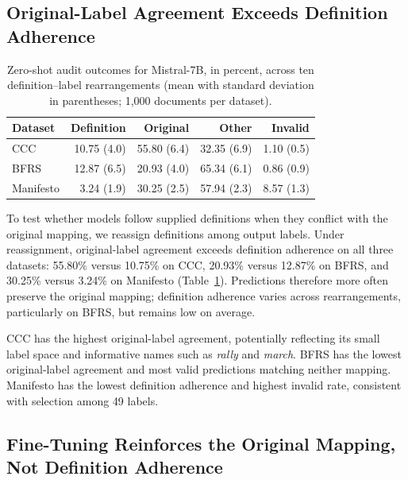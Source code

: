 \documentclass[11pt]{article}
\begin{document}
\subsection{Original-Label Agreement Exceeds Definition Adherence}
\label{sec:r-audit}

\begin{table}[t]
\centering
\small
\setlength{\tabcolsep}{3pt}

\begin{tabular}{lrrrr}
\toprule
\textbf{Dataset} & \textbf{Definition} & \textbf{Original} & \textbf{Other} & \textbf{Invalid} \\
\midrule
CCC        & 10.75 (4.0) & 55.80 (6.4) & 32.35 (6.9)& 1.10 (0.5) \\
BFRS       & 12.87 (6.5) & 20.93 (4.0) & 65.34 (6.1) & 0.86 (0.9) \\
Manifesto & 3.24 (1.9)  & 30.25 (2.5) & 57.94 (2.3) & 8.57 (1.3)  \\
\bottomrule
\end{tabular}%
\caption{Zero-shot audit outcomes for Mistral-7B, in percent, across ten definition--label rearrangements (mean with standard deviation in parentheses; 1,000 documents per dataset).}
\label{tab:permutation-robustness}
\end{table}

To test whether models follow supplied definitions when they conflict with the original mapping, we reassign definitions among output labels. Under reassignment, original-label agreement exceeds definition adherence on all three datasets: 55.80\% versus 10.75\% on CCC, 20.93\% versus 12.87\% on BFRS, and 30.25\% versus 3.24\% on Manifesto (Table~\ref{tab:permutation-robustness}). Predictions therefore more often preserve the original mapping; definition adherence varies across rearrangements, particularly on BFRS, but remains low on average.

CCC has the highest original-label agreement, potentially reflecting its small label space and informative names such as \emph{rally} and \emph{march}. BFRS has the lowest original-label agreement and most valid predictions matching neither mapping. Manifesto has the lowest definition adherence and highest invalid rate, consistent with selection among 49 labels.

\subsection{Fine-Tuning Reinforces the Original Mapping, Not Definition Adherence}
\label{sec:r-ft}
\end{document}
